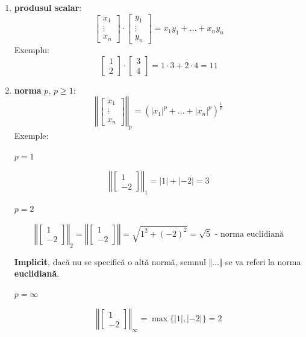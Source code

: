 \documentclass[12pt]{article}
\begin{document}
	\begin{enumerate}
		\item \textbf{produsul scalar}: $$\begin{bmatrix}
		x_1\\
		\vdots\\
		x_n
		\end{bmatrix} \cdot \begin{bmatrix}
		y_1\\
		\vdots\\
		y_n
		\end{bmatrix} = x_1 y_1 + \dots + x_n y_n$$
		Exemplu:
		$$\begin{bmatrix}
		1\\
		2
		\end{bmatrix} \cdot \begin{bmatrix}
		3\\
		4
		\end{bmatrix} = 1\cdot 3 + 2 \cdot 4 = 11$$
		\item \textbf{norma} $p$, $p \geq 1 $: $$\left\Vert \begin{bmatrix}
		x_1\\
		\vdots\\
		x_n
		\end{bmatrix} \right\Vert_p = (|x_1|^p + \dots + |x_n|^p)^\frac{1}{p}$$
		Exemple:
		
		$p=1$
		
		$$\left\Vert \begin{bmatrix}
		1\\
		-2
		\end{bmatrix}\right\Vert_1 = |1| + |-2| = 3$$
		
		$p = 2$
		
		$$\left\Vert \begin{bmatrix}
		1\\
		-2
		\end{bmatrix} \right\Vert_2 = \left\Vert \begin{bmatrix}
		1\\
		-2
		\end{bmatrix} \right\Vert = \sqrt{1^2 + (-2)^2} = \sqrt{5}\text{ - norma euclidiană}$$
		
		\textbf{Implicit}, dacă nu se specifică o altă normă, semnul $\Vert ... \Vert$ se va referi la norma \textbf{euclidiană}.
		
		$p=\infty$
		
		$$\left\Vert \begin{bmatrix}
		1\\
		-2
		\end{bmatrix} \right\Vert_\infty = \max \{|1|,|-2|\} = 2$$
		

\end{enumerate}
\end{document}
